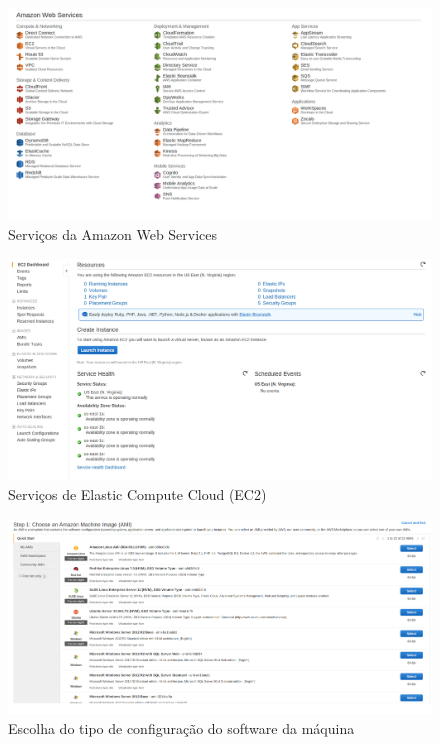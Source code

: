 \begin{figure}[htp]
    \begin{center}
    \includegraphics[width=1\textwidth]{img/aws_servicos}
    \end{center}
    \caption{Serviços da Amazon Web Services}
    \label{fig:aws_servicos}
\end{figure}

\begin{figure}[htp]
    \begin{center}
    \includegraphics[width=1\textwidth]{img/aws_ec2}
    \end{center}
    \caption{Serviços de Elastic Compute Cloud (EC2)}
    \label{fig:aws_ec2}
\end{figure}

\begin{figure}[htp]
    \begin{center}
    \includegraphics[width=1\textwidth]{img/aws_setup_ec2}
    \end{center}
    \caption{Escolha do tipo de configuração do software da máquina}
    \label{fig:aws_setup_ec2}
\end{figure}


